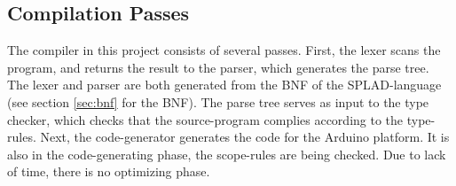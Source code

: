 \subsection{Compilation Passes}
\label{sec:CompilationPasses}
The compiler in this project consists of several passes. First, the lexer scans the program, and returns the result to the parser, which generates the parse tree. The lexer and parser are both generated from the BNF of the SPLAD-language (see section \ref{sec:bnf} for the BNF). The parse tree serves as input to the type checker, which checks that the source-program complies according to the type-rules. Next, the code-generator generates the code for the Arduino platform. It is also in the code-generating phase, the scope-rules are being checked. Due to lack of time, there is no optimizing phase. 